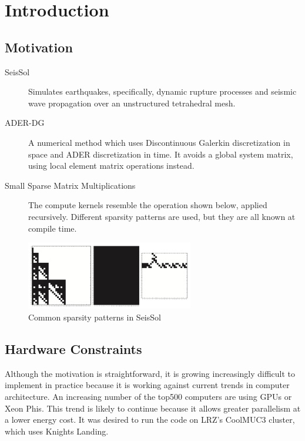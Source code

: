 \chapter{Introduction}
\label{chapter:Introduction}


\section{Motivation}

\begin{description}
	\item[SeisSol]
    Simulates earthquakes, specifically, dynamic rupture processes and seismic wave propagation over an unstructured tetrahedral mesh. 

    \item[ADER-DG]
    A numerical method which uses Discontinuous Galerkin discretization in space and ADER discretization in time. It avoids a global system matrix, using local element matrix operations instead.

    \item[Small Sparse Matrix Multiplications]
    The compute kernels resemble the operation shown below, applied recursively. Different sparsity patterns are used, but they are all known at compile time.
\end{description}

\begin{figure}
  \centering
  \includegraphics[height=3cm]{images/seissol_visc.png}
  \caption{Common sparsity patterns in SeisSol}
  \label{fig:seissol_star}
\end{figure}

\section{Hardware Constraints}

Although the motivation is straightforward, it is growing increasingly difficult to implement in practice because it is working against current trends in computer architecture. An increasing number of the top500 computers are using GPUs or Xeon Phis. This trend is likely to continue because it allows greater parallelism at a lower energy cost. It was desired to run the code on LRZ's CoolMUC3 cluster, which uses Knights Landing.

